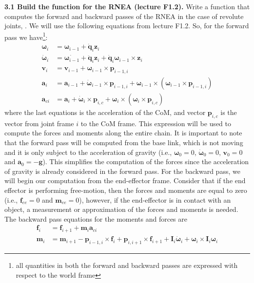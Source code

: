 \documentclass[11pt]{article}
\begin{document}
\textbf{3.1 Build the function for the RNEA (lecture F1.2).} Write a function that computes the forward and backward passes of the RNEA in the case of revolute joints, . We will use the following equations from lecture F1.2. So, for the forward pass we have\footnote{all quantities in both the forward and backward passes are expressed with respect to the world frame}:
\begin{align*}
	\boldsymbol{\omega}_i &= \boldsymbol{\omega}_{i-1} + \dot{\mathbf{q}}_i \mathbf{z}_i \\
%	
	\dot{\boldsymbol{\omega}}_i &= \dot{\boldsymbol{\omega}_{i-1}} + \ddot{\mathbf{q}}_i \mathbf{z}_i + \dot{\mathbf{q}}_i \boldsymbol{\omega}_{i-1} \times \mathbf{z}_i \\
%	
	\mathbf{v}_i &= \mathbf{v}_{i-1} + \boldsymbol{\omega}_{i-1} \times \mathbf{p}_{i-1,i} \\
%	
	\mathbf{a}_i &= \mathbf{a}_{i-1} + \dot{\boldsymbol{\omega}}_{i-1} \times \mathbf{p}_{i-1,i} + \boldsymbol{\omega}_{i-1} 	\times (\boldsymbol{\omega}_{i-1} \times \mathbf{p}_{i-1,i}) \\
%	
	\mathbf{a}_{ci} &= \mathbf{a}_{i} + \dot{\boldsymbol{\omega}}_{i} \times \mathbf{p}_{i,c} + \boldsymbol{\omega}_{i} 	\times (\boldsymbol{\omega}_{i} \times \mathbf{p}_{i,c})
\end{align*} 
where the last equations is the acceleration of the CoM, and vector $\mathbf{p}_{i,c}$ is the vector from joint frame $i$ to the CoM frame. This expression will be used to compute the forces and moments along the entire chain. It is important to note that the forward pass will be computed from the base link, which is not moving and it is only subject to the acceleration of gravity (i.e., $\boldsymbol{\omega}_0 = 0$, $\dot{\boldsymbol{\omega}}_0 = 0$, $\mathbf{v}_0 = 0$ and $\mathbf{a}_0 = -\mathbf{g}$). This simplifies the computation of the forces since the acceleration of gravity is already considered in the forward pass. For the backward pass, we will begin our computation from the end-effector frame. Consider that if the end effector is performing free-motion, then the forces and moments are equal to zero (i.e., $\mathbf{f}_{ee} =0$ and $\mathbf{m}_{ee} = 0$), however, if the end-effector is in contact with an object, a measurement or approximation of the forces and moments is needed. The backward pass equations for the moments and forces are
\begin{align*}
	\mathbf{f}_i &= \mathbf{f}_{i+1} + \mathbf{m}_i\mathbf{a}_{ci} \\
	\mathbf{m}_i &= \mathbf{m}_{i+1} - \mathbf{p}_{i-1,i} \times \mathbf{f}_i + \mathbf{p}_{i,i+1} \times \mathbf{f}_{i+1} + \mathbf{I}_i \dot{\boldsymbol{\omega}}_i + \boldsymbol{\omega}_i  \times \mathbf{I}_i \boldsymbol{\omega}_i
\end{align*}
\end{document}
